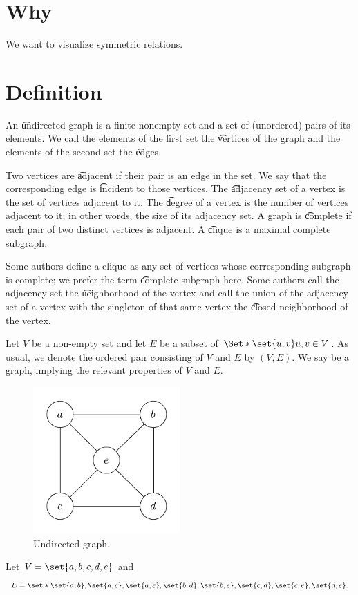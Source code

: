 
\section{Why}

We want to visualize symmetric relations.

\section{Definition}

An \t{undirected graph} is a finite nonempty set and a set of (unordered) pairs of its elements.
We call the elements of the first set the \t{vertices} of the graph and the elements of the second set the \t{edges}.

Two vertices are \t{adjacent} if their pair is an edge in the set.
We say that the corresponding edge is \t{incident} to those vertices.
The \t{adjacency set} of a vertex is the set of vertices adjacent to it.
The \t{degree} of a vertex is the number of vertices adjacent to it; in other words, the size of its adjacency set.
A graph is \t{complete} if each pair of two distinct vertices is adjacent.
A \t{clique} is a maximal complete subgraph.


Some authors define a clique as any set of vertices whose corresponding subgraph is complete; we prefer the term \t{complete subgraph} here.
Some authors call the adjacency set the \t{neighborhood} of the vertex and call the union of the adjacency set of a vertex with the singleton of that same vertex the \t{closed neighborhood} of the vertex.


Let $V$ be a non-empty set and let $E$ be a subset of $\Set*{\set{u, v}}{u, v \in V}$.
As usual, we denote the ordered pair consisting of $V$ and $E$ by $(V, E)$.
We say  be a graph, implying the relevant properties of $V$ and $E$.


\begin{figure}
  \centering
  \includegraphics[width=0.5\textwidth]{graphics_included/undirected_graph}
  \caption{Undirected graph.}
\end{figure}

Let $V = \set{a, b, c, d, e}$
and
$$
  E = \set*{\set{a, b}, \set{a, c}, \set{a, e}, \set{b, d}, \set{b, e}, \set{c, d}, \set{c, e}, \set{d,e}}.
$$
